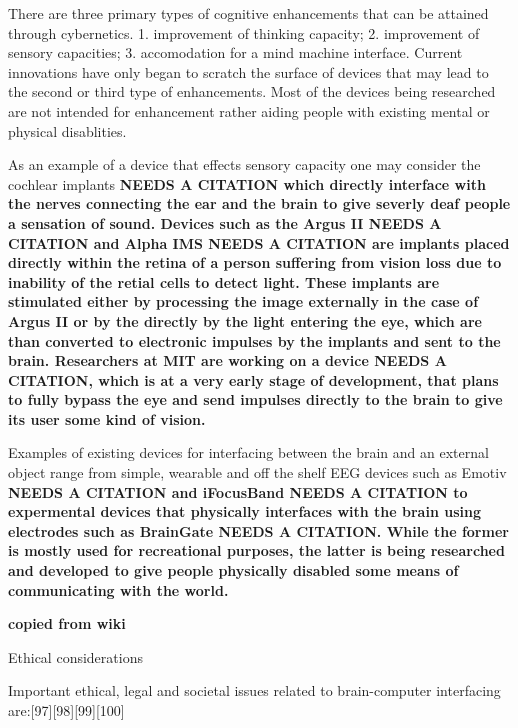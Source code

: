 There are three primary types of cognitive enhancements that can be attained through cybernetics. 1. improvement of thinking capacity; 2. improvement of sensory capacities; 3. accomodation for a mind machine interface. Current innovations have only began to scratch the surface of devices that may lead to the second or third type of enhancements. Most of the devices being researched are not intended for enhancement rather aiding people with existing mental or physical disablities. 

As an example of a device that effects sensory capacity one may consider the cochlear implants \bf{NEEDS A CITATION} which directly interface with the nerves connecting the ear and the brain to give severly deaf people a sensation of sound. Devices such as the Argus II \bf{NEEDS A CITATION} and Alpha IMS \bf{NEEDS A CITATION} are implants placed directly within the retina of a person suffering from vision loss due to inability of the retial cells to detect light. These implants are stimulated either by processing the image externally in the case of Argus II or by the directly by the light entering the eye, which are than converted to electronic impulses by the implants and sent to the brain. Researchers at MIT are working on a device \bf{NEEDS A CITATION}, which is at a very early stage of development, that plans to fully bypass the eye and send impulses directly to the brain to give its user some kind of vision.

Examples of existing devices for interfacing between the brain and an external object range from simple, wearable and off the shelf EEG devices such as Emotiv \bf{NEEDS A CITATION} and iFocusBand \bf{NEEDS A CITATION} to expermental devices that physically interfaces with the brain using electrodes such as BrainGate \bf{NEEDS A CITATION}. While the former is mostly used for recreational purposes, the latter is being researched and developed to give people physically disabled some means of communicating with the world.


\bf{copied from wiki} 

Ethical considerations

Important ethical, legal and societal issues related to brain-computer interfacing are:[97][98][99][100]

